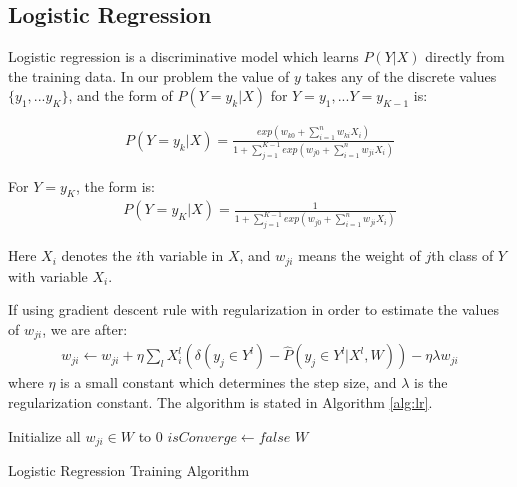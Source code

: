 \subsection{Logistic Regression}

Logistic regression is a discriminative model which learns $P(Y|X)$ directly from the training data. In our problem the value of $y$ takes any of the discrete values $\{y_1,...y_K\}$, and the form of $P(Y=y_k|X)$ for $Y=y_1,...Y=y_{K-1}$ is: 

\begin{gather}
	P(Y=y_k|X)=\frac{exp(w_{k0}+\sum_{i=1}^n{w_{ki}X_i})}{1+\sum_{j=1}^{K-1}exp(w_{j0}+\sum_{i=1}^n{w_{ji}X_i})}
\end{gather}

For $Y=y_K$, the form is:
\begin{gather}
	P(Y=y_K|X)=\frac{1}{1+\sum_{j=1}^{K-1}exp(w_{j0}+\sum_{i=1}^n{w_{ji}X_i})}
\end{gather}

Here $X_i$ denotes the $i$th variable in $X$, and $w_{ji}$ means the weight of $j$th class of $Y$ with variable $X_i$.

If using gradient descent rule with regularization in order to estimate the values of $w_{ji}$, we are after:
\begin{gather}
	w_{ji} \leftarrow w_{ji}+ \eta \sum_{l}X_{i}^{l}(\delta (y_{j} \in Y^{l})-\hat{P}(y_{j} \in Y^{l}|X^{l},W))- \eta \lambda w_{ji}
\end{gather}
where $\eta$ is a small constant which determines the step size, and $\lambda$ is the regularization constant. The algorithm is stated in Algorithm \ref{alg:lr}.

\IncMargin{1em}
\begin{algorithm}
\label{alg:lr}
\BlankLine
Initialize all $w_{ji} \in W$ to 0\;
$isConverge \leftarrow false$\;
\Return $W$\;
\caption{Logistic Regression Training Algorithm}\label{algo_disjdecomp}
\end{algorithm}
\DecMargin{1em}

